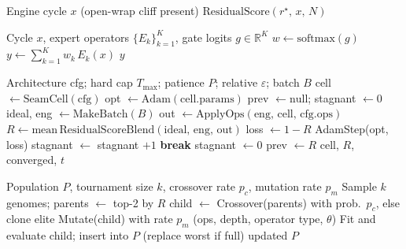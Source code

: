 \begin{algorithm}[H]
\caption{No-bake (passthrough) control}
\label{alg:no-bake}
\begin{algorithmic}[1]
\Require Engine cycle $x$ (open-wrap cliff present)
\State \Return $\mathrm{ResidualScore}(r^{\star},\,x,\,N)$ 
\end{algorithmic}
\end{algorithm}

\begin{algorithm}[H]
\caption{MoE soft gating over bake experts}
\label{alg:moe}
\begin{algorithmic}[1]
\Require Cycle $x$, expert operators $\{E_k\}_{k=1}^{K}$, gate logits $g\in\mathbb{R}^{K}$
\State $w \gets \mathrm{softmax}(g)$
\State $y \gets \sum_{k=1}^{K} w_k\, E_k(x)$
\State \Return $y$
\end{algorithmic}
\end{algorithm}

\begin{algorithm}[H]
\caption{FitCell (inner loop; converge protocol)}
\label{alg:fit}
\begin{algorithmic}[1]
\Require Architecture cfg; hard cap $T_{\max}$; patience $P$; relative $\varepsilon$; batch $B$
\State cell $\gets \mathrm{SeamCell}(\mathrm{cfg})$
\State opt $\gets \mathrm{Adam}(\mathrm{cell.params})$
\State prev $\gets \mathrm{null}$; stagnant $\gets 0$
  \State ideal, eng $\gets \mathrm{MakeBatch}(B)$
  \State out $\gets \mathrm{ApplyOps}(\mathrm{eng},\,\mathrm{cell},\,\mathrm{cfg.ops})$
  \State $R \gets \mathrm{mean}\,\mathrm{ResidualScoreBlend}(\mathrm{ideal},\,\mathrm{eng},\,\mathrm{out})$
  \State loss $\gets 1-R$
    \State AdamStep(opt, loss)
  \EndIf
    \State stagnant $\gets$ stagnant $+1$
      \State \textbf{break} 
    \EndIf
  \Else
    \State stagnant $\gets 0$
  \EndIf
  \State prev $\gets R$
\EndFor
\State \Return cell, $R$, converged, $t$
\end{algorithmic}
\end{algorithm}

\begin{algorithm}[H]
\caption{GA tournament step}
\label{alg:ga}
\begin{algorithmic}[1]
\Require Population $P$, tournament size $k$, crossover rate $p_c$, mutation rate $p_m$
\State Sample $k$ genomes; parents $\gets$ top-2 by $R$
\State child $\gets$ Crossover(parents) with prob.\ $p_c$, else clone elite
\State Mutate(child) with rate $p_m$ (ops, depth, operator type, $\theta$)
\State Fit and evaluate child; insert into $P$ (replace worst if full)
\State \Return updated $P$
\end{algorithmic}
\end{algorithm}

